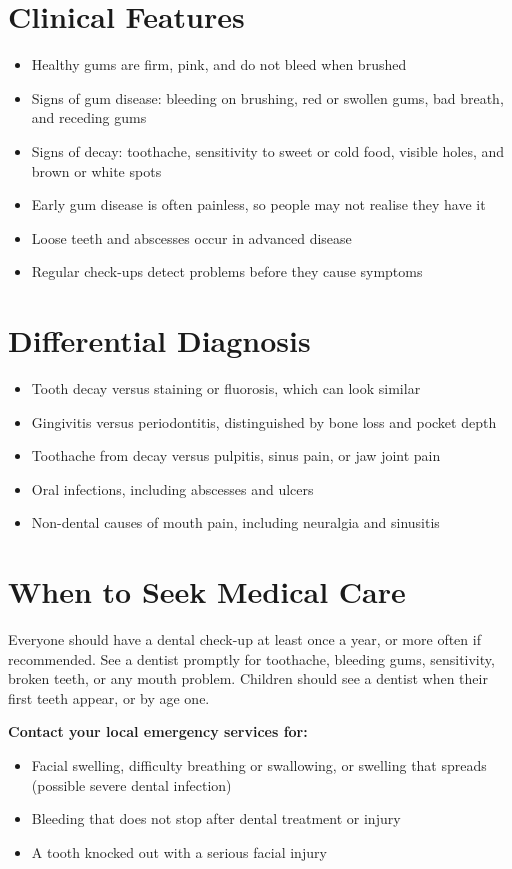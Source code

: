 \section*{Clinical Features}
\begin{itemize}
    \item Healthy gums are firm, pink, and do not bleed when brushed
    \item Signs of gum disease: bleeding on brushing, red or swollen gums, bad breath, and receding gums
    \item Signs of decay: toothache, sensitivity to sweet or cold food, visible holes, and brown or white spots
    \item Early gum disease is often painless, so people may not realise they have it
    \item Loose teeth and abscesses occur in advanced disease
    \item Regular check-ups detect problems before they cause symptoms
\end{itemize}

\section*{Differential Diagnosis}
\begin{itemize}
    \item Tooth decay versus staining or fluorosis, which can look similar
    \item Gingivitis versus periodontitis, distinguished by bone loss and pocket depth
    \item Toothache from decay versus pulpitis, sinus pain, or jaw joint pain
    \item Oral infections, including abscesses and ulcers
    \item Non-dental causes of mouth pain, including neuralgia and sinusitis
\end{itemize}

\section*{When to Seek Medical Care}
Everyone should have a dental check-up at least once a year, or more often if recommended. See a dentist promptly for toothache, bleeding gums, sensitivity, broken teeth, or any mouth problem. Children should see a dentist when their first teeth appear, or by age one.

\textbf{Contact your local emergency services for:}
\begin{itemize}
    \item Facial swelling, difficulty breathing or swallowing, or swelling that spreads (possible severe dental infection)
    \item Bleeding that does not stop after dental treatment or injury
    \item A tooth knocked out with a serious facial injury
\end{itemize}

